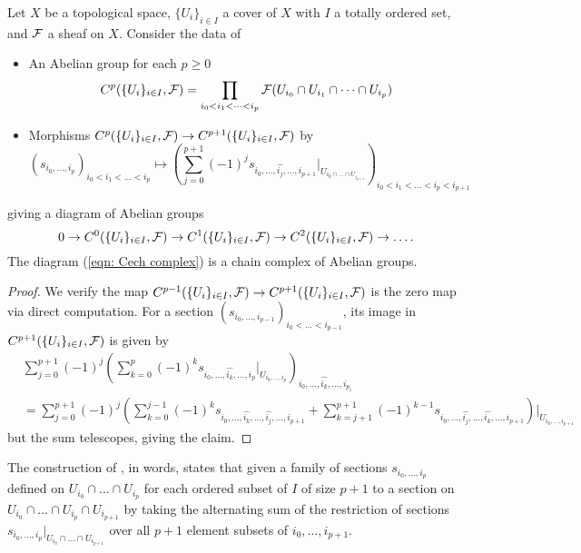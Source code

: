 \begin{proposition}\label{prop: cech complex is a complex}
    Let $X$ be a topological space, $\{U_{i}\}_{i\in I}$ a cover of $X$ with $I$ a totally ordered set, and $\mathcal{F}$ a sheaf on $X$. Consider the data of
    \begin{itemize}
        \item An Abelian group for each $p\geq0$
        $$C^{p}(\{U_{i}\}_{i\in I},\mathcal{F})=\prod_{i_{0}<i_{1}<\dots<i_{p}}\mathcal{F}(U_{i_{0}}\cap U_{i_{1}}\cap \dots\cap U_{i_{p}})$$
        \item Morphisms $C^{p}(\{U_{i}\}_{i\in I},\mathcal{F})\to C^{p+1}(\{U_{i}\}_{i\in I},\mathcal{F})$ by 
        $$(s_{i_{0},\dots,i_{p}})_{i_{0}<i_{1}<\dots<i_{p}}\mapsto\left(\sum_{j=0}^{p+1}(-1)^{j}s_{i_{0},\dots,\widehat{i_{j}},\dots,i_{p+1}}|_{U_{i_{0}\cap\dots \cap U_{i_{p+1}}}}\right)_{i_{0}<i_{1}<\dots<i_{p}<i_{p+1}}$$
    \end{itemize}
    giving a diagram of Abelian groups 
    \begin{equation}\label{eqn: Cech complex}
        0\to C^{0}(\{U_{i}\}_{i\in I},\mathcal{F})\to C^{1}(\{U_{i}\}_{i\in I},\mathcal{F})\to C^{2}(\{U_{i}\}_{i\in I},\mathcal{F})\to\dots.
    \end{equation}
    The diagram (\ref{eqn: Cech complex}) is a chain complex of Abelian groups. 
\end{proposition}
\begin{proof}
    We verify the map $C^{p-1}(\{U_{i}\}_{i\in I},\mathcal{F})\to C^{p+1}(\{U_{i}\}_{i\in I},\mathcal{F})$ is the zero map via direct computation. For a section $(s_{i_{0},\dots,i_{p-1}})_{i_{0}<\dots<i_{p-1}}$, its image in $C^{p+1}(\{U_{i}\}_{i\in I},\mathcal{F})$ is given by 
    \begin{align*}
        &\sum_{j=0}^{p+1}(-1)^{j}\left(\sum_{k=0}^{p}(-1)^{k}s_{i_{0},\dots,\widehat{i_{k}},\dots,i_{p}}|_{U_{i_{0},\dots,i_{p}}}\right)_{i_{0},\dots,\widehat{i_{k}},\dots,i_{p_1}} \\
        &= \sum_{j=0}^{p+1}(-1)^{j}\left(\sum_{k=0}^{j-1}(-1)^{k}s_{i_{0},\dots,\widehat{i_{k}},\dots,\widehat{i_{j}},\dots,i_{p+1}}+\sum_{k=j+1}^{p+1}(-1)^{k-1}s_{i_{0},\dots,\widehat{i_{j}},\dots,\widehat{i_{k}},\dots,i_{p+1}}\right)|_{U_{i_{0},\dots,i_{p+1}}}
    \end{align*}
    but the sum telescopes, giving the claim. 
\end{proof}
\begin{remark}
    The construction of , in words, states that given a family of sections $s_{i_{0},\dots,i_{p}}$ defined on $U_{i_{0}}\cap\dots\cap U_{i_{p}}$ for each ordered subset of $I$ of size $p+1$ to a section on $U_{i_{0}}\cap\dots\cap U_{i_{p}}\cap U_{i_{p+1}}$ by taking the alternating sum of the restriction of sections $s_{i_{0},\dots,i_{p}}|_{U_{i_{0}}\cap\dots\cap U_{i_{p+1}}}$ over all $p+1$ element subsets of $i_{0},\dots,i_{p+1}$. 
\end{remark}
